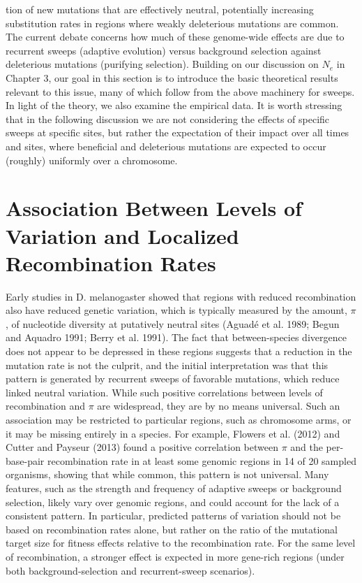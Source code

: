 \documentclass{article}
\begin{document}
tion of new mutations that are effectively neutral, potentially increasing substitution rates in regions where weakly deleterious mutations are common. The current debate concerns how much of these genome-wide effects are due to recurrent sweeps (adaptive evolution) versus background selection against deleterious mutations (purifying selection). Building on our discussion on  $ N_{e} $ in Chapter 3, our goal in this section is to introduce the basic theoretical results relevant to this issue, many of which follow from the above machinery for sweeps. In light of the theory, we also examine the empirical data. It is worth stressing that in the following discussion we are not considering the effects of specific sweeps at specific sites, but rather the expectation of their impact over all times and sites, where beneficial and deleterious mutations are expected to occur (roughly) uniformly over a chromosome.

\section{Association Between Levels of Variation and Localized Recombination Rates}
Early studies in D. melanogaster showed that regions with reduced recombination also have reduced genetic variation, which is typically measured by the amount,  $ \pi $, of nucleotide diversity at putatively neutral sites (Aguadé et al. 1989; Begun and Aquadro 1991; Berry et al. 1991). The fact that between-species divergence does not appear to be depressed in these regions suggests that a reduction in the mutation rate is not the culprit, and the initial interpretation was that this pattern is generated by recurrent sweeps of favorable mutations, which reduce linked neutral variation. While such positive correlations between levels of recombination and  $ \pi $ are widespread, they are by no means universal. Such an association may be restricted to particular regions, such as chromosome arms, or it may be missing entirely in a species. For example, Flowers et al. (2012) and Cutter and Payseur (2013) found a positive correlation between  $ \pi $ and the per-base-pair recombination rate in at least some genomic regions in 14 of 20 sampled organisms, showing that while common, this pattern is not universal. Many features, such as the strength and frequency of adaptive sweeps or background selection, likely vary over genomic regions, and could account for the lack of a consistent pattern. In particular, predicted patterns of variation should not be based on recombination rates alone, but rather on the ratio of the mutational target size for fitness effects relative to the recombination rate. For the same level of recombination, a stronger effect is expected in more gene-rich regions (under both background-selection and recurrent-sweep scenarios).
\end{document}
